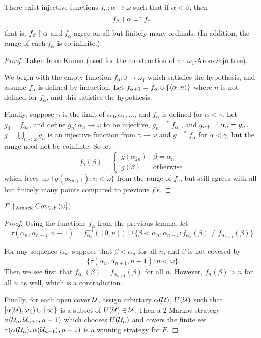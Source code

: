   \begin{lemma}
    There exist injective functions $f_\alpha:\alpha\to\omega$ such that if $\alpha<\beta$, then \[f_\beta\restriction\alpha =^* f_\alpha\] that is, $f_\beta\restriction\alpha$ and $f_\alpha$ agree on all but finitely many ordinals. (In addition, the range of each $f_\alpha$ is co-infinite.)
  \end{lemma}

  \begin{proof}
    Taken from Kunen (used for the construction of an $\omega_1$-Aronszajn tree).

    We begin with the empty function $f_0:0\to\omega_1$ which satisfies the hypothesis, and assume $f_\alpha$ is defined by induction. Let $f_{\alpha+1} = f_\alpha \cup \{\langle\alpha,n\rangle\}$ where $n$ is not defined for $f_\alpha$, and this satisfies the hypothesis.

    Finally, suppose $\gamma$ is the limit of $\alpha_0,\alpha_1,\dots$, and $f_\alpha$ is defined for $\alpha<\gamma$. Let $g_0=f_{\alpha_0}$, and define $g_n : \alpha_n \to \omega$ to be injective, $g_n=^* f_{\alpha_n}$, and $g_{n+1} \restriction \alpha_n = g_n$. $g = \bigcup_{n<\omega} g_n$ is an injective function from $\gamma \to \omega$ and $g =^* f_\alpha$ for $\alpha <\gamma$, but the range need not be coinfinte. So let
    \[
      f_\gamma(\beta) = \left\{
      \begin{array}{ll}
        g(\alpha_{2n}) & \beta = \alpha_n \\
        g(\beta) & \text{otherwise}
      \end{array}
      \right.
    \]
    which frees up $\{g(\alpha_{2n+1}):n<\omega\}$ from the range of $f_\gamma$, but still agrees with all but finitely many points compared to previous $f$'s.
  \end{proof}

  \begin{example}
    $F \uparrow_{2\text{-mark}} Cov_{C,F}(\omega_1^\dagger)$
  \end{example}

  \begin{proof}
    Using the functions $f_\alpha$ from the previous lemma, let \[\tau(\alpha_n,\alpha_{n+1},n+1)=f_{\alpha_n}^{-1}([0,n]) \cup \{\beta<\alpha_n,\alpha_{n+1} : f_{\alpha_n}(\beta)\not=f_{\alpha_{n+1}}(\beta)\}\]

    For any sequence $\alpha_n$, suppose that $\beta<\alpha_n$ for all $n$, and $\beta$ is not covered by \[\{\tau(\alpha_n,\alpha_{n+1},n+1): n<\omega\}\] Then we see first that $f_{\alpha_n}(\beta)=f_{\alpha_{n+1}}(\beta)$ for all $n$. However, $f_{n}(\beta)>n$ for all $n$ as well, which is a contradiction.

    Finally, for each open cover $\mathcal{U}$, assign arbirtary $\alpha(\mathcal{U})$, $U(\mathcal{U})$ such that $[\alpha(\mathcal{U}),\omega_1)\cup\{\infty\}$ is a subset of $U(\mathcal{U})\in\mathcal{U}$. Then a $2$-Markov strategy $\sigma(\mathcal{U}_n,\mathcal{U}_{n+1},n+1)$ which chooses $U(\mathcal{U}_n)$ and covers the finite set $\tau(\alpha(\mathcal{U}_n),\alpha(\mathcal{U}_{n+1}),n+1)$ is a winning strategy for $F$.
  \end{proof}

